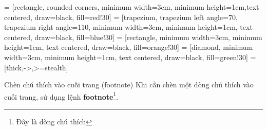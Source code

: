 \usetikzlibrary{shapes.geometric, arrows}

 = [rectangle, rounded corners, minimum width=3cm, minimum height=1cm,text centered, draw=black, fill=red!30]
 = [trapezium, trapezium left angle=70, trapezium right angle=110, minimum width=3cm, minimum height=1cm, text centered, draw=black, fill=blue!30]
 = [rectangle, minimum width=3cm, minimum height=1cm, text centered, draw=black, fill=orange!30]
 = [diamond, minimum width=3cm, minimum height=1cm, text centered, draw=black, fill=green!30]
 = [thick,->,>=stealth]



Chèn chú thích vào cuối trang (footnote)
Khi cần chèn một dòng chú thích vào cuối trang, sử dụng lệnh \textbf{footnote}\footnote{Đây là dòng chú thích}.




